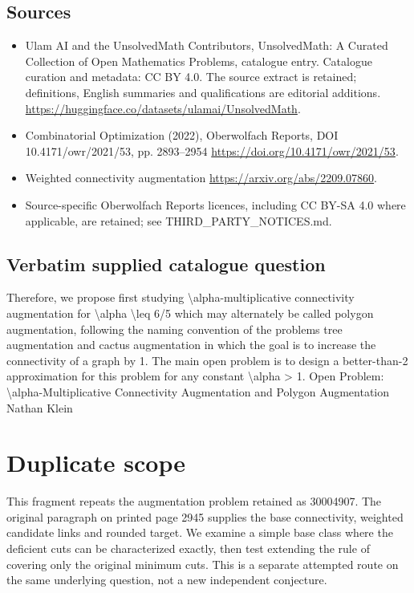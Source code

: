 \documentclass[11pt]{article}
\begin{document}
\subsection{Sources}
\begin{itemize}
\item[S1] Ulam AI and the UnsolvedMath Contributors, UnsolvedMath: A Curated Collection of Open Mathematics Problems, catalogue entry. Catalogue curation and metadata: CC BY 4.0. The source extract is retained; definitions, English summaries and qualifications are editorial additions.
\url{https://huggingface.co/datasets/ulamai/UnsolvedMath}.
\item[S2] Combinatorial Optimization (2022), Oberwolfach Reports, DOI 10.4171/owr/2021/53, pp. 2893--2954
\url{https://doi.org/10.4171/owr/2021/53}.
\item[S3] Weighted connectivity augmentation
\url{https://arxiv.org/abs/2209.07860}.
\item Source-specific Oberwolfach Reports licences, including CC BY-SA 4.0 where applicable, are retained; see THIRD\_PARTY\_NOTICES.md.
\end{itemize}
\subsection{Verbatim supplied catalogue question}
Therefore, we propose first studying \textbackslash{}alpha-multiplicative connectivity augmentation for \textbackslash{}alpha \textbackslash{}leq 6/5 which may alternately be called polygon augmentation, following the naming convention of the problems tree augmentation and cactus augmentation in which the goal is to increase the connectivity of a graph by 1. The main open problem is to design a better-than-2 approximation for this problem for any constant \textbackslash{}alpha > 1. Open Problem: \textbackslash{}alpha-Multiplicative Connectivity Augmentation and Polygon Augmentation Nathan Klein

\section{Duplicate scope}
This fragment repeats the augmentation problem retained as 30004907.
The original paragraph on printed page 2945 supplies the base
connectivity, weighted candidate links and rounded target. We examine
a simple base class where the deficient cuts can be characterized
exactly, then test extending the rule of covering only the original
minimum cuts. This is a separate attempted route on the same
underlying question, not a new independent conjecture.
\end{document}
